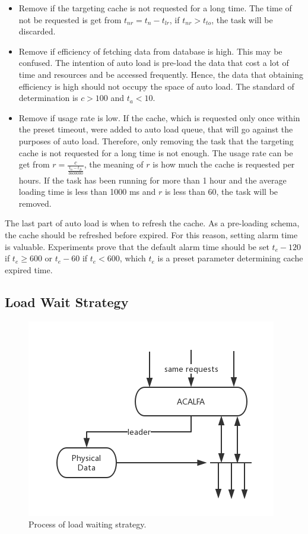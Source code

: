 \documentclass[conference]{IEEEtran}
\begin{document}
\begin{itemize}
    \item Remove if the targeting cache is not requested for a long time. The time of not be requested is get from $t_{nr} = t_n - t_{lr}$, if $t_{nr} > t_{to}$, the task will be discarded.
    \item Remove if efficiency of fetching data from database is high. This may be confused. The intention of auto load is pre-load the data that cost a lot of time and resources and be accessed frequently. Hence, the data that obtaining efficiency is high should not occupy the space of auto load. The standard of determination is $c > 100$ and $t_a < 10$.
    \item Remove if usage rate is low. If the cache, which is requested only once within the preset timeout, were added to auto load queue, that will go against the purposes of auto load. Therefore, only removing the task that the targeting cache is not requested for a long time is not enough. The usage rate can be get from $r = \frac{c}{\frac{t_n - t_{fr}}{3600000}}$, the meaning of $r$ is how much the cache is requested per hours. If the task has been running for more than 1 hour and the average loading time is less than 1000 ms and $r$ is less than 60, the task will be removed.
\end{itemize}{}

The last part of auto load is when to refresh the cache. As a pre-loading schema, the cache should be refreshed before expired. For this reason, setting alarm time is valuable. Experiments prove that the default alarm time should be set $t_e - 120$ if $t_e \geq 600$ or $t_e - 60$ if $t_e < 600$, which $t_e$ is a preset parameter determining cache expired time.

\subsection{Load Wait Strategy}

\begin{figure} [htb]
    \centering
    \includegraphics[width=0.8\linewidth]{img/load-wait-strategy.png}
    \caption{Process of load waiting strategy.}
    \label{load_wait_strategy}
\end{figure}
\end{document}
